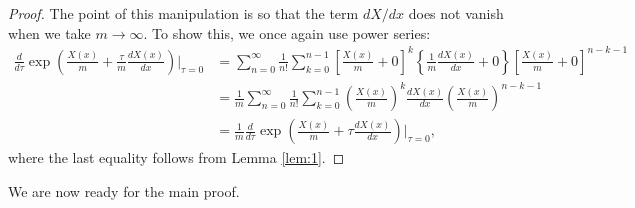 \documentclass{article}
\theoremstyle{definition}
\newcommand{\f}[2]{\frac{#1}{#2}}
\newcommand{\lp}{\left(}
\newcommand{\rp}{\right)}
\newcommand{\lb}{\left[}
\newcommand{\rb}{\right]}
\newcommand{\lc}{\left\{}
\newcommand{\rc}{\right\}}
\begin{document}
\begin{enumerate}[label=(\alph*)]
	\begin{proof}
		The point of this manipulation is so that the term $dX/dx$ does not vanish when we take $m\to \infty$. To show this, we once again use power series:
		\begin{align*}
		\f{d}{d\tau} \exp\lp \f{X(x)}{m} + \f{\tau}{m} \f{dX(x)}{dx}\rp \bigg\vert_{\tau = 0} 
		&= \sum^\infty_{n=0} \f{1}{n!}\sum^{n-1}_{k=0} \lb \f{X(x)}{m} + 0\rb^k \lc \f{1}{m}\f{dX(x)}{dx} + 0 \rc \lb \f{X(x)}{m} + 0 \rb^{n-k-1} \\
		&= \f{1}{m} \sum^\infty_{n=0} \f{1}{n!}\sum^{n-1}_{k=0} \lp \f{X(x)}{m}\rp^k \f{dX(x)}{dx} \lp \f{X(x)}{m} \rp^{n-k-1} \\
		&= \f{1}{m}\f{d}{d\tau} \exp \lp \f{X(x)}{m} + \tau \f{dX(x)}{dx} \rp\bigg\vert_{\tau=0},
		\end{align*}
		where the last equality follows from Lemma \ref{lem:1}. 
	\end{proof}
	
	We are now ready for the main proof. 
	

\end{enumerate}
\end{document}
